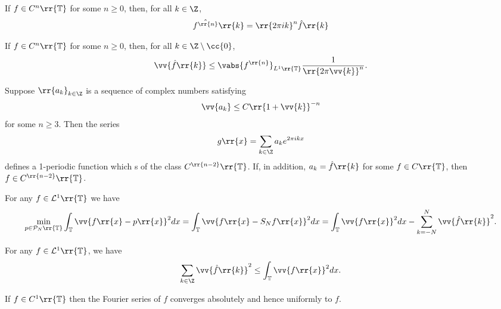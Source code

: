 \documentclass{article}
\begin{document}
\begin{proposition}
  If $f\in C^n\rr{\mathbb T}$ for some $n\geq 0$, then, for all $k\in\Z$,
  \begin{align*}
    \hat{f^{\rr{n}}}\rr{k}=\rr{2\pi ik}^n \hat f\rr{k}
  \end{align*}
\end{proposition}

\begin{corollary}
  If $f\in C^n\rr{\mathbb T}$ for some $n\geq 0$, then, for all $k\in\Z\setminus\cc{0}$,
  \begin{align*}
    \vv{\hat f\rr{k}}\leq \vabs{f^{\rr{n}}}_{L^1\rr{\mathbb T}} \frac{1}{\rr{2\pi\vv{k}}^n}.
  \end{align*}
\end{corollary}

\begin{proposition}
  Suppose $\rr{a_k}_{k\in\Z}$ is a sequence of complex numbers satisfying
  \begin{align*}
    \vv{a_k}\leq C\rr{1+\vv{k}}^{-n}
  \end{align*}
  for some $n\geq 3$. Then the series
  \begin{align*}
    g\rr{x}=\sum_{k\in\Z} a_k e^{2\pi ikx}
  \end{align*}
  defines a 1-periodic function which s of the class $C^{\rr{n-2}}\rr{\mathbb T}$. If,
  in addition, $a_k=\hat f\rr{k}$ for some $f\in C\rr{\mathbb T}$, then
  $f\in C^{\rr{n-2}}\rr{\mathbb T}$.
\end{proposition}

\begin{proposition}
  For any $f\in\mathcal L^1\rr{\mathbb T}$ we have
  \begin{align*}
    \min_{p\in\mathcal P_N\rr{\mathbb T}} \int_{\mathbb T}\vv{f\rr{x}-p\rr{x}}^2 dx
    = \int_{\mathbb T}\vv{f\rr{x}-S_Nf\rr{x}}^2dx
    = \int_{\mathbb T}\vv{f\rr{x}}^2dx - \sum_{k=-N}^{ N } \vv{\hat f\rr{k}}^2.
  \end{align*}
\end{proposition}

\begin{corollary}[Bessel]
  For any $f\in\mathcal L^1\rr{\mathbb T}$, we have
  \begin{align*}
    \sum_{k\in\Z}\vv{\hat f\rr{k}}^2 \leq \int_{\mathbb T}\vv{f\rr{x}}^2dx.
  \end{align*}
\end{corollary}

\begin{proposition}
  If $f\in C^1\rr{\mathbb T}$ then the Fourier series of $f$ converges absolutely and hence
  uniformly to $f$.
\end{proposition}
\end{document}

